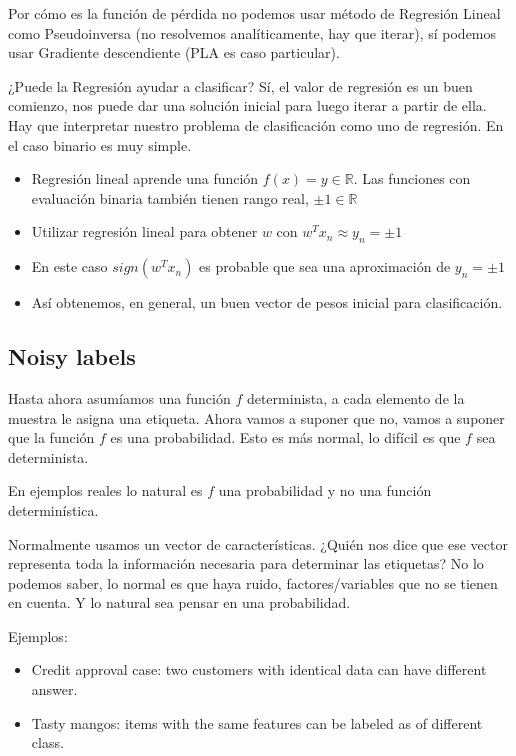 \documentclass[11pt,a4paper]{article}
\theoremstyle{definition}
\newcommand{\R}{\mathbb{R}}
\begin{document}
	Por cómo es la función de pérdida no podemos usar método de Regresión Lineal como Pseudoinversa (no resolvemos analíticamente, hay que iterar), sí podemos usar Gradiente descendiente (PLA es caso particular). 
	
	¿Puede la Regresión ayudar a clasificar?
	Sí, el valor de regresión es un buen comienzo, nos puede dar una solución inicial para luego iterar a partir de ella. Hay que interpretar nuestro problema de clasificación como uno de regresión. En el caso binario es muy simple.
	\begin{itemize}
		\item Regresión lineal aprende una función $f(x)=y\in \R$. Las funciones con evaluación binaria también tienen rango real, $\pm 1\in \R$
		\item Utilizar regresión lineal para obtener $w$ con $w^T x_n \approx y_n = \pm 1$
		\item En este caso $sign(w^T x_n)$ es probable que sea una aproximación de $y_n=\pm 1$
		\item Así obtenemos, en general, un buen vector de pesos inicial para clasificación.
	\end{itemize}
	
	\subsection{Noisy labels}
	Hasta ahora asumíamos una función $f$ determinista, a cada elemento de la muestra le asigna una etiqueta. Ahora vamos a suponer que no, vamos a suponer que la función $f$ es una probabilidad. Esto es más normal, lo difícil es que $f$ sea determinista.
	
	En ejemplos reales lo natural es $f$ una probabilidad y no una función determinística.
	
	Normalmente usamos un vector de características. ¿Quién nos dice que ese vector representa toda la información necesaria para determinar las etiquetas? No lo podemos saber, lo normal es que haya ruido, factores/variables que no se tienen en cuenta. Y lo natural sea pensar en una probabilidad.
	
	Ejemplos:
	\begin{itemize}
		\item Credit approval case: two customers with identical data can have different answer.
		\item Tasty mangos: items with the same features can be labeled as of different class.
	\end{itemize}
	
\end{document}
